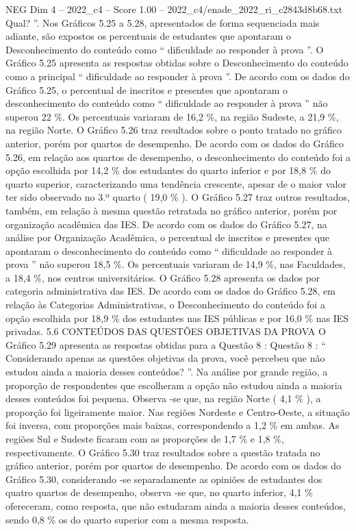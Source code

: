 \begin{textsample}{NEG Dim 4 – 2022\_c4 – Score 1.00 – 2022\_c4/enade\_2022\_ri\_c2843d8b68.txt}
Qual? ”.
Nos Gráficos 5.25 a 5.28, apresentados de forma sequenciada mais adiante, são expostos os percentuais de estudantes que apontaram o Desconhecimento do conteúdo como “ dificuldade ao responder à prova ”.
O Gráfico 5.25 apresenta as respostas obtidas sobre o Desconhecimento do conteúdo como a principal “ dificuldade ao responder à prova ”.
De acordo com os dados do Gráfico 5.25, o percentual de inscritos e presentes que apontaram o desconhecimento do conteúdo como “ dificuldade ao responder à prova ” não superou 22 \%.
Os percentuais variaram de 16,2 \%, na região Sudeste, a 21,9 \%, na região Norte.
O Gráfico 5.26 traz resultados sobre o ponto tratado no gráfico anterior, porém por quartos de desempenho.
De acordo com os dados do Gráfico 5.26, em relação aos quartos de desempenho, o desconhecimento do conteúdo foi a opção escolhida por 14,2 \% dos estudantes do quarto inferior e por 18,8 \% do quarto superior, caracterizando uma tendência crescente, apesar de o maior valor ter sido observado no 3.º quarto ( 19,0 \% ).
O Gráfico 5.27 traz outros resultados, também, em relação à mesma questão retratada no gráfico anterior, porém por organização acadêmica das IES.
De acordo com os dados do Gráfico 5.27, na análise por Organização Acadêmica, o percentual de inscritos e presentes que apontaram o desconhecimento do conteúdo como “ dificuldade ao responder à prova ” não superou 18,5 \%.
Os percentuais variaram de 14,9 \%, nas Faculdades, a 18,4 \%, nos centros universitários.
O Gráfico 5.28 apresenta os dados por categoria administrativa das IES.
De acordo com os dados do Gráfico 5.28, em relação às Categorias Administrativas, o Desconhecimento do conteúdo foi a opção escolhida por 18,9 \% dos estudantes nas IES públicas e por 16,0 \% nas IES privadas. 5.6 CONTEÚDOS DAS QUESTÕES OBJETIVAS DA PROVA O Gráfico 5.29 apresenta as respostas obtidas para a Questão 8 : Questão 8 : “ Considerando apenas as questões objetivas da prova, você percebeu que não estudou ainda a maioria desses conteúdos? ”.
Na análise por grande região, a proporção de respondentes que escolheram a opção não estudou ainda a maioria desses conteúdos foi pequena.
Observa -se que, na região Norte ( 4,1 \% ), a proporção foi ligeiramente maior.
Nas regiões Nordeste e Centro-Oeste, a situação foi inversa, com proporções mais baixas, correspondendo a 1,2 \% em ambas.
As regiões Sul e Sudeste ficaram com as proporções de 1,7 \% e 1,8 \%, respectivamente.
O Gráfico 5.30 traz resultados sobre a questão tratada no gráfico anterior, porém por quartos de desempenho.
De acordo com os dados do Gráfico 5.30, considerando -se separadamente as opiniões de estudantes dos quatro quartos de desempenho, observa -se que, no quarto inferior, 4,1 \% ofereceram, como resposta, que não estudaram ainda a maioria desses conteúdos, sendo 0,8 \% os do quarto superior com a mesma resposta.

\end{textsample}
